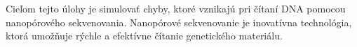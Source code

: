 Cieľom tejto úlohy je simulovať chyby, ktoré vznikajú pri čítaní DNA pomocou nanopórového sekvenovania.
Nanopórové sekvenovanie je inovatívna technológia, ktorá umožňuje rýchle a efektívne čítanie genetického materiálu.
